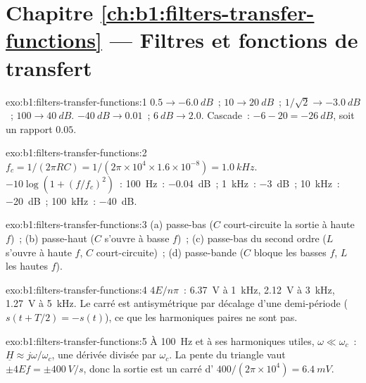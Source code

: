 \section*{Chapitre \ref{ch:b1:filters-transfer-functions} --- Filtres et fonctions de transfert}

\begin{solution}{exo:b1:filters-transfer-functions:1}
$0.5 \to \qty{-6.0}{dB}$~; $10 \to \qty{20}{dB}$~; $1/\sqrt2 \to \qty{-3.0}{dB}$~;
$100 \to \qty{40}{dB}$. $\qty{-40}{dB} \to 0.01$~; $\qty{+6}{dB} \to 2.0$.
Cascade~: $-6 - 20 = \qty{-26}{dB}$, soit un rapport $0.05$.
\end{solution}

\begin{solution}{exo:b1:filters-transfer-functions:2}
$f_c = 1/(2\pi RC) = 1/(2\pi \times 10^4 \times 1.6\times10^{-8}) =
\qty{1.0}{kHz}$.  $-10\log(1 + (f/f_c)^2)$~: \qty{100}{Hz}~:
\qty{-0.04}{dB}~; \qty{1}{kHz}~: \qty{-3}{dB}~; \qty{10}{kHz}~: \qty{-20}{dB}~;
\qty{100}{kHz}~: \qty{-40}{dB}.
\end{solution}

\begin{solution}{exo:b1:filters-transfer-functions:3}
(a) passe-bas ($C$ court-circuite la sortie à haute $f$)~; (b) passe-haut
($C$ s'ouvre à basse $f$)~; (c) passe-bas du second ordre ($L$ s'ouvre à
haute $f$, $C$ court-circuite)~; (d) passe-bande ($C$ bloque les basses
$f$, $L$ les hautes $f$).
\end{solution}

\begin{solution}{exo:b1:filters-transfer-functions:4}
$4E/n\pi$~: \qty{6.37}{V} à \qty{1}{kHz}, \qty{2.12}{V} à \qty{3}{kHz},
\qty{1.27}{V} à \qty{5}{kHz}. Le  carré est antisymétrique par
décalage d'une demi-période ($s(t + T/2) = -s(t)$), ce que les
harmoniques paires ne sont pas.
\end{solution}

\begin{solution}{exo:b1:filters-transfer-functions:5}
À \qty{100}{Hz} et à ses harmoniques utiles, $\omega \ll \omega_c$~:
$\underline H \approx j\omega/\omega_c$, une dérivée divisée par
$\omega_c$. La pente du triangle vaut $\pm 4Ef = \pm\qty{400}{V/s}$, donc
la sortie est un  carré d' $400/(2\pi \times 10^4) =
\qty{6.4}{mV}$.
\end{solution}


